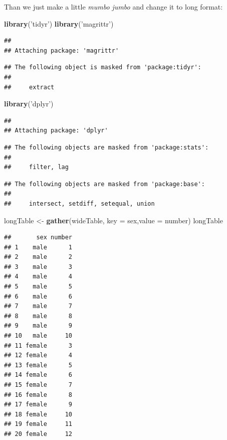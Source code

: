 \documentclass[]{book}
\newenvironment{Shaded}{\begin{snugshade}}{\end{snugshade}}
\newcommand{\KeywordTok}[1]{\textcolor[rgb]{0.12,0.11,0.11}{\textbf{#1}}}
\newcommand{\DataTypeTok}[1]{\textcolor[rgb]{0.00,0.34,0.68}{#1}}
\newcommand{\StringTok}[1]{\textcolor[rgb]{0.75,0.01,0.01}{#1}}
\newcommand{\NormalTok}[1]{\textcolor[rgb]{0.12,0.11,0.11}{#1}}
\theoremstyle{definition}
\theoremstyle{definition}
\theoremstyle{definition}
\theoremstyle{remark}
\begin{document}
Than we just make a little \emph{mumbo jumbo} and change it to long
format:

\begin{Shaded}
\begin{Highlighting}[]
\KeywordTok{library}\NormalTok{(}\StringTok{'tidyr'}\NormalTok{)}
\KeywordTok{library}\NormalTok{(}\StringTok{'magrittr'}\NormalTok{)}
\end{Highlighting}
\end{Shaded}

\begin{verbatim}
## 
## Attaching package: 'magrittr'
\end{verbatim}

\begin{verbatim}
## The following object is masked from 'package:tidyr':
## 
##     extract
\end{verbatim}

\begin{Shaded}
\begin{Highlighting}[]
\KeywordTok{library}\NormalTok{(}\StringTok{'dplyr'}\NormalTok{)}
\end{Highlighting}
\end{Shaded}

\begin{verbatim}
## 
## Attaching package: 'dplyr'
\end{verbatim}

\begin{verbatim}
## The following objects are masked from 'package:stats':
## 
##     filter, lag
\end{verbatim}

\begin{verbatim}
## The following objects are masked from 'package:base':
## 
##     intersect, setdiff, setequal, union
\end{verbatim}

\begin{Shaded}
\begin{Highlighting}[]
\NormalTok{longTable <-}\StringTok{ }\KeywordTok{gather}\NormalTok{(wideTable, }\DataTypeTok{key =}\NormalTok{ sex,}\DataTypeTok{value =}\NormalTok{ number)}
\NormalTok{longTable}
\end{Highlighting}
\end{Shaded}

\begin{verbatim}
##       sex number
## 1    male      1
## 2    male      2
## 3    male      3
## 4    male      4
## 5    male      5
## 6    male      6
## 7    male      7
## 8    male      8
## 9    male      9
## 10   male     10
## 11 female      3
## 12 female      4
## 13 female      5
## 14 female      6
## 15 female      7
## 16 female      8
## 17 female      9
## 18 female     10
## 19 female     11
## 20 female     12
\end{verbatim}
\end{document}
